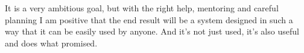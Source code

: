 \documentclass[minf,twoside,singlespacing,parskip,frontabs,notimes,11pt]{infthesis}
\begin{document}
It is a very ambitious goal, but with the right help, mentoring and careful planning I am positive that the end result will be a system designed in such a way that it can be easily used by anyone. And it's not just used, it's also useful and does what promised.


\raggedright


\end{document}
